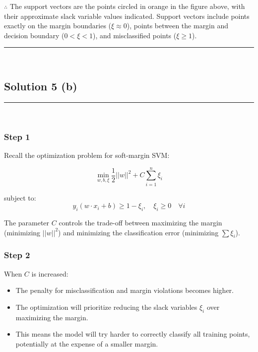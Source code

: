 \documentclass{article}
\begin{document}
\subsubsection*{\normalfont}{$\therefore$ The support vectors are the points circled in orange in the figure above, with their approximate slack variable values indicated. Support vectors include points exactly on the margin boundaries ($\xi \approx 0$), points between the margin and decision boundary ($0 < \xi < 1$), and misclassified points ($\xi \geq 1$).}

\noindent\rule{\textwidth}{0.4pt}\\

\newpage

\subsection*{Solution 5 (b)}
\noindent\rule{\textwidth}{0.4pt}\\

\subsubsection*{Step 1}
\parbox{\textwidth}{
Recall the optimization problem for soft-margin SVM:

$$\min_{w, b, \xi} \frac{1}{2} ||w||^2 + C \sum_{i=1}^{n} \xi_i$$

subject to:
$$y_i(w \cdot x_i + b) \geq 1 - \xi_i, \quad \xi_i \geq 0 \quad \forall i$$

The parameter $C$ controls the trade-off between maximizing the margin (minimizing $||w||^2$) and minimizing the classification error (minimizing $\sum \xi_i$).
}

\subsubsection*{Step 2}
\parbox{\textwidth}{
When $C$ is increased:
\begin{itemize}
    \item The penalty for misclassification and margin violations becomes higher.
    \item The optimization will prioritize reducing the slack variables $\xi_i$ over maximizing the margin.
    \item This means the model will try harder to correctly classify all training points, potentially at the expense of a smaller margin.
\end{itemize}
}
\end{document}
